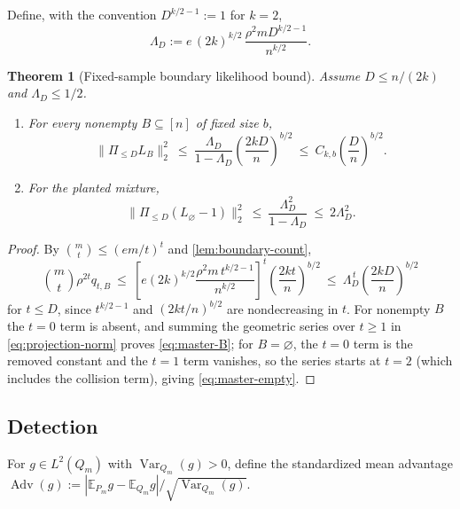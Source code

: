 \documentclass[11pt]{article}
\newtheorem{theorem}{Theorem}[section]
\theoremstyle{definition}
\theoremstyle{remark}
\newcommand{\E}{\mathbb E}
\newcommand{\1}{\mathbf 1}
\DeclareMathOperator{\Var}{Var}
\DeclareMathOperator{\Adv}{Adv}
\numberwithin{equation}{section}
\begin{document}
Define, with the convention $D^{k/2-1}:=1$ for $k=2$,
\begin{equation}\label{eq:LambdaD}
 \Lambda_D:=e\,(2k)^{k/2}\,
 \frac{\rho^2mD^{k/2-1}}{n^{k/2}} .
\end{equation}

\begin{theorem}[Fixed-sample boundary likelihood bound]\label{thm:master}
Assume $D\le n/(2k)$ and $\Lambda_D\le1/2$.
\begin{enumerate}
\item For every nonempty $B\subseteq[n]$ of fixed size $b$,
\begin{equation}\label{eq:master-B}
 \bigl\|\Pi_{\le D}L_B\bigr\|_2^2
 \ \le\ \frac{\Lambda_D}{1-\Lambda_D}
 \left(\frac{2kD}n\right)^{b/2}
 \ \le\ C_{k,b}\left(\frac Dn\right)^{b/2}.
\end{equation}
\item For the planted mixture,
\begin{equation}\label{eq:master-empty}
 \bigl\|\Pi_{\le D}(L_\varnothing-1)\bigr\|_2^2
 \ \le\ \frac{\Lambda_D^2}{1-\Lambda_D}\ \le\ 2\Lambda_D^2 .
\end{equation}
\end{enumerate}
\end{theorem}
\begin{proof}
By $\binom mt\le(em/t)^t$ and \cref{lem:boundary-count},
\begin{equation}\label{eq:master-term}
 \binom mt\rho^{2t}q_{t,B}
 \ \le\
 \left[e(2k)^{k/2}\frac{\rho^2m\,t^{k/2-1}}{n^{k/2}}\right]^{t}
 \left(\frac{2kt}n\right)^{b/2}
 \ \le\ \Lambda_D^{\,t}\left(\frac{2kD}n\right)^{b/2}
\end{equation}
for $t\le D$, since $t^{k/2-1}$ and $(2kt/n)^{b/2}$ are nondecreasing
in $t$.  For nonempty $B$ the $t=0$ term is absent, and summing the
geometric series over $t\ge1$ in \cref{eq:projection-norm} proves
\cref{eq:master-B}; for $B=\varnothing$, the $t=0$ term is the removed
constant and the $t=1$ term vanishes, so the series starts at $t=2$
(which includes the collision term), giving \cref{eq:master-empty}.
\end{proof}

\subsection{Detection}

For $g\in L^2(Q_m)$ with $\Var_{Q_m}(g)>0$, define the standardized mean
advantage
$\Adv(g):=|\E_{P_m}g-\E_{Q_m}g|/\sqrt{\Var_{Q_m}(g)}$.
\end{document}

